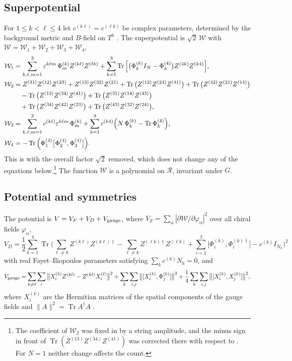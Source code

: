 \documentclass[11pt]{amsart}
\theoremstyle{definition}
\newcommand{\Tr}{\operatorname{Tr}}
\newcommand{\cR}{\mathcal R}
\newcommand{\cW}{\mathcal W}
\begin{document}
\subsection{Superpotential}
For $1\le k<\ell\le4$ let $c^{(k\ell)}=c^{(\ell k)}$ be complex parameters, determined by the background metric and $B$-field on $T^6$ \cite{CGMS14}. The superpotential is $\sqrt2\,\cW$ with $\cW=\cW_1+\cW_2+\cW_3+\cW_4$,
\begin{align}
\cW_1&=\sum_{k,\ell,m=1}^3\varepsilon^{k\ell m}\,\Phi^{(k)}_mZ^{(k\ell)}Z^{(\ell k)}+\sum_{k=1}^3\Tr\Big[\big(\Phi^{(k)}_kI_N-\Phi^{(4)}_k\big)Z^{(4k)}Z^{(k4)}\Big],\label{eq:W1}\\
\cW_2&=Z^{(31)}Z^{(12)}Z^{(23)}+Z^{(13)}Z^{(32)}Z^{(21)}+\Tr\big(Z^{(12)}Z^{(24)}Z^{(41)}\big)+\Tr\big(Z^{(42)}Z^{(21)}Z^{(14)}\big)\notag\\
&\quad-\Tr\big(Z^{(13)}Z^{(34)}Z^{(41)}\big)+\Tr\big(Z^{(31)}Z^{(14)}Z^{(43)}\big)\notag\\
&\quad+\Tr\big(Z^{(34)}Z^{(42)}Z^{(23)}\big)+\Tr\big(Z^{(43)}Z^{(32)}Z^{(24)}\big),\label{eq:W2}\\
\cW_3&=\sum_{k,\ell,m=1}^3c^{(k\ell)}\varepsilon^{k\ell m}\,\Phi^{(k)}_m+\sum_{k=1}^3c^{(k4)}\Big(N\,\Phi^{(k)}_k-\Tr\Phi^{(4)}_k\Big),\label{eq:W3}\\
\cW_4&=-\Tr\Big(\Phi^{(4)}_1\big[\Phi^{(4)}_2,\Phi^{(4)}_3\big]\Big).\label{eq:W4}
\end{align}
This is \cite[Section~2]{CGMS16} with the overall factor $\sqrt2$ removed, which does not change any of the equations below.\footnote{The coefficient of $\cW_2$ was fixed in \cite{CGMS16} by a string amplitude, and the minus sign in front of $\Tr(Z^{(13)}Z^{(34)}Z^{(41)})$ was corrected there with respect to \cite{CGMS14}. For $N=1$ neither change affects the count.} The function $\cW$ is a polynomial on $\cR$, invariant under $G$.

\subsection{Potential and symmetries}
The potential is $V=V_F+V_D+V_{\rm gauge}$, where $V_F=\sum_\alpha|\partial\cW/\partial\varphi_\alpha|^2$ over all chiral fields $\varphi_\alpha$,
\[
V_D=\frac12\sum_{k=1}^4\Tr\Big(\sum_{\ell\ne k}Z^{(k\ell)}Z^{(k\ell)\dagger}-\sum_{\ell\ne k}Z^{(\ell k)\dagger}Z^{(\ell k)}+\sum_{i=1}^3\big[\Phi^{(k)}_i,\Phi^{(k)\dagger}_i\big]-c^{(k)}I_{N_k}\Big)^2
\]
with real Fayet--Iliopoulos parameters satisfying $\sum_kc^{(k)}N_k=0$, and
\[
V_{\rm gauge}=\sum_{k\ne\ell}\sum_{i}\big\|X^{(k)}_iZ^{(k\ell)}-Z^{(k\ell)}X^{(\ell)}_i\big\|^2+\sum_{k}\sum_{i,j}\big\|[X^{(k)}_i,\Phi^{(k)}_j]\big\|^2+\frac14\sum_k\sum_{i,j}\big\|[X^{(k)}_i,X^{(k)}_j]\big\|^2,
\]
where $X^{(k)}_i$ are the Hermitian matrices of the spatial components of the gauge fields and $\|A\|^2=\Tr A^\dagger A$ \cite[Section~2]{CGMS16}.
\end{document}
